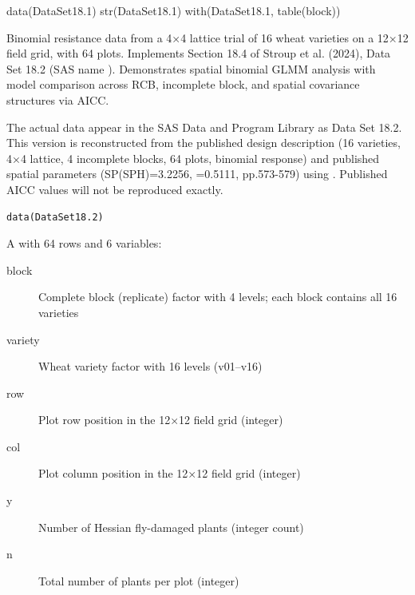 \documentclass[a4paper]{book}
\begin{document}
%
\begin{SeeAlso}
\end{SeeAlso}
%
\begin{Examples}
\begin{ExampleCode}
data(DataSet18.1)
str(DataSet18.1)
with(DataSet18.1, table(block))
\end{ExampleCode}
\end{Examples}
%
\begin{Description}
Binomial resistance data from a 4×4 lattice trial of 16 wheat varieties
on a 12×12 field grid, with 64 plots.  Implements Section 18.4 of Stroup
et al. (2024), Data Set 18.2 (SAS name ).  Demonstrates
spatial binomial GLMM analysis with model comparison across RCB, incomplete
block, and spatial covariance structures via AICC.

 The actual data appear in the SAS Data and
Program Library as Data Set 18.2.  This version is reconstructed from the
published design description (16 varieties, 4×4 lattice, 4 incomplete
blocks, 64 plots, binomial response) and published spatial parameters
(SP(SPH)=3.2256, =0.5111, pp.573-579) using
.  Published AICC values will not be reproduced exactly.
\end{Description}
%
\begin{Usage}
\begin{verbatim}
data(DataSet18.2)
\end{verbatim}
\end{Usage}
%
\begin{Format}
A  with 64 rows and 6 variables:
\begin{description}

\item[block] Complete block (replicate) factor with 4 levels;
each block contains all 16 varieties
\item[variety] Wheat variety factor with 16 levels (v01–v16)
\item[row] Plot row position in the 12×12 field grid (integer)
\item[col] Plot column position in the 12×12 field grid (integer)
\item[y] Number of Hessian fly-damaged plants (integer count)
\item[n] Total number of plants per plot (integer)

\end{description}

\end{Format}
\end{document}
